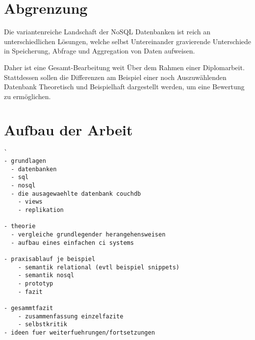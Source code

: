 \section{Abgrenzung}


Die variantenreiche Landschaft der NoSQL Datenbanken ist reich an unterschiedlichen Lösungen,
welche selbst Untereinander gravierende Unterschiede in Speicherung, Abfrage und Aggregation von Daten aufweisen.

Daher ist eine Gesamt-Bearbeitung weit Über dem Rahmen einer Diplomarbeit.
Stattdessen sollen die Differenzen am Beispiel einer noch Auszuwählenden Datenbank
Theoretisch und Beispielhaft dargestellt werden, um eine Bewertung zu ermöglichen.


\section{Aufbau der Arbeit}




\begin{verbatim}`
- grundlagen
  - datenbanken
  - sql
  - nosql
  - die ausagewaehlte datenbank couchdb
    - views
    - replikation

- theorie
  - vergleiche grundlegender herangehensweisen
  - aufbau eines einfachen ci systems

- praxisablauf je beispiel
    - semantik relational (evtl beispiel snippets)
    - semantik nosql
    - prototyp
    - fazit

- gesammtfazit
    - zusammenfassung einzelfazite
    - selbstkritik
- ideen fuer weiterfuehrungen/fortsetzungen
\end{verbatim}
